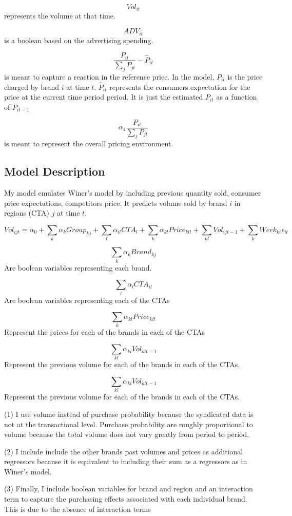 \documentclass{article}
\begin{document}
$$Vol_{it}$$ represents the volume at that time.

$$ADV_{it}$$ is a boolean based on the advertising spending.

$$\dfrac{P_{it}} {\sum_j P_{jt}} - \hat{P}_{it}$$ is meant to capture a reaction in the reference price.  In the model, $P_{it}$ is the price charged by brand $i$ at time $t$. $\hat{P}_{it}$ represents the consumers expectation for the price at the current time period period. It is just the estimated ${P}_{it}$ as a function of ${P}_{it-1}$ 

$$ \alpha_4 \dfrac {P_{it}}{\sum_j P_{jt}}$$ is meant to represent the overall pricing environment.

\subsection{Model Description}

My model emulates Winer's model by including previous quantity sold, consumer price expectations, competitors price. It predicts volume sold by brand $i$ in regions (CTA) $j$ at time $t$.

$$Vol_{ijt} = \alpha_0 + \sum_{k} \alpha_{k} Group_{kj} + \sum_{l} \alpha_{il} CTA_{l} + \sum_{k} \alpha_{kl} Price_{klt} + \sum_{kl} Vol_{ijt-1} + \sum_{k} Week_{kt} \epsilon_{it}$$

$$\sum_{k} \alpha_{k} Brand_{kj}$$ Are boolean variables representing each brand.

$$\sum_{l} \alpha_{l} CTA_{il}$$ Are boolean variables representing each of the CTAs

$$\sum_{k} \alpha_{kl} Price_{klt}$$ Represent the prices for each of the brands in each of the CTAs

$$\sum_{kl} \alpha_{kl} Vol_{klt-1}$$ Represent the previous volume for each of the brands in each of the CTAs.

$$\sum_{kl} \alpha_{kl} Vol_{klt-1}$$ Represent the previous volume for each of the brands in each of the CTAs.

(1) I use volume instead of purchase probability because the syndicated data is not at the transactional level. Purchase probability are roughly proportional to volume because the total volume does not vary greatly from period to period. 

(2) I include include the other brands past volumes and prices as additional regressors because it is equivalent to including their sum as a regressors as in Winer's model. 

(3) Finally, I include boolean variables for brand and region and an interaction term to capture the purchasing effects associated with each individual brand. This is due to the absence of interaction terms
\end{document}

